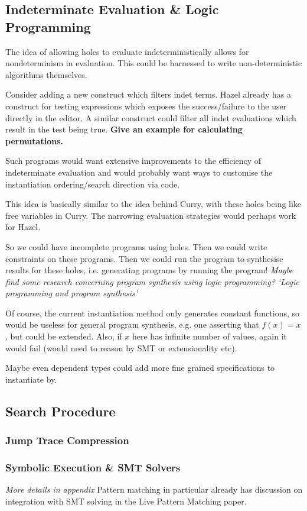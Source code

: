 \subsection{Indeterminate Evaluation \& Logic Programming}
\label{sec:LogicProgramming}
The idea of allowing holes to evaluate indeterministically allows for nondeterminism in evaluation. This could be harnessed to write non-deterministic algorithms themselves.

Consider adding a new construct which filters indet terms. Hazel already has a construct for testing expressions which exposes the success/failure to the user directly in the editor. A similar construct could filter all indet evaluations which result in the test being true. \textbf{Give an example for calculating permutations.}

Such programs would want extensive improvements to the efficiency of indeterminate evaluation and would probably want ways to customise the instantiation ordering/search direction via code.

This idea is basically similar to the idea behind Curry, with these holes being like free variables in Curry. The narrowing evaluation strategies would perhaps work for Hazel.

So we could have incomplete programs using holes. Then we could write constraints on these programs. Then we could run the program to synthesise results for these holes, i.e. generating programs by running the program! \textit{Maybe find some research concerning program synthesis using logic programming? `Logic programming and program synthesis'}

Of course, the current instantiation method only generates constant functions, so would be useless for general program synthesis, e.g. one asserting that $f(x) = x$, but could be extended. Also, if $x$ here has infinite number of values, again it would fail (would need to reason by SMT or extensionality etc).

Maybe even dependent types could add more fine grained specifications to instantiate by.
\subsection{Search Procedure}
\subsubsection{Jump Trace Compression}
\subsubsection{Symbolic Execution \& SMT Solvers}
\textit{More details in appendix}
Pattern matching in particular already has discussion on integration with SMT solving in the Live Pattern Matching paper.

